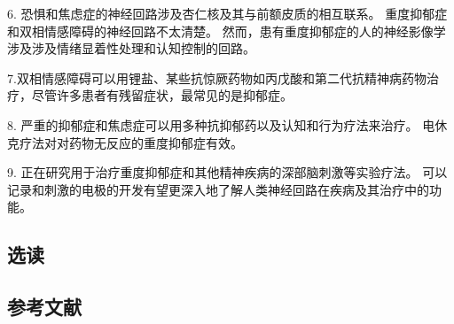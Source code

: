 6. 恐惧和焦虑症的神经回路涉及杏仁核及其与前额皮质的相互联系。 重度抑郁症和双相情感障碍的神经回路不太清楚。 然而，患有重度抑郁症的人的神经影像学涉及涉及情绪显着性处理和认知控制的回路。 

7.双相情感障碍可以用锂盐、某些抗惊厥药物如丙戊酸和第二代抗精神病药物治疗，尽管许多患者有残留症状，最常见的是抑郁症。

8. 严重的抑郁症和焦虑症可以用多种抗抑郁药以及认知和行为疗法来治疗。 电休克疗法对对药物无反应的重度抑郁症有效。 

9. 正在研究用于治疗重度抑郁症和其他精神疾病的深部脑刺激等实验疗法。 可以记录和刺激的电极的开发有望更深入地了解人类神经回路在疾病及其治疗中的功能。
\subsection{选读}
\subsection{参考文献}


